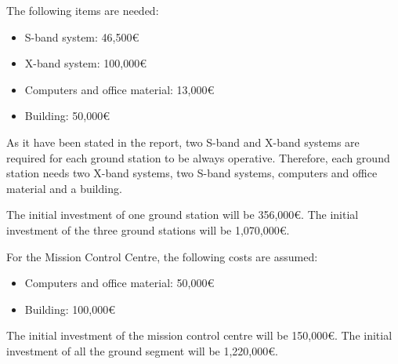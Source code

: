 The following items are needed:
\begin{itemize}
\item S-band system: 46,500\euro
\item X-band system: 100,000\euro
\item Computers and office material: 13,000\euro
\item Building: 50,000\euro
\end{itemize}

As it have been stated in the report, two S-band and X-band systems are required for each ground station to be always operative. Therefore, each ground station needs two X-band systems, two S-band systems, computers and office material and a building.

The initial investment of one ground station will be 356,000\euro . The initial investment of the three ground stations will be 1,070,000\euro .

For the Mission Control Centre, the following costs are assumed:
\begin{itemize}
\item Computers and office material: 50,000\euro
\item Building: 100,000\euro
\end{itemize}

The initial investment of the mission control centre will be 150,000\euro . The initial investment of all the ground segment will be 1,220,000\euro .